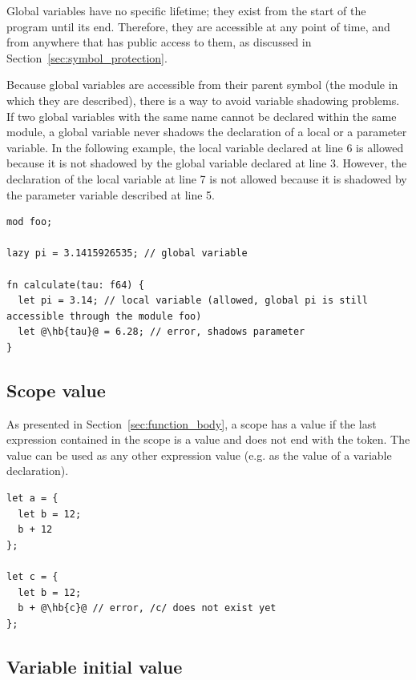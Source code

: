 Global variables have no specific lifetime; they exist from the start of the
program until its end. Therefore, they are accessible at any point of time, and
from anywhere that has public access to them, as discussed in
Section~\ref{sec:symbol_protection}.

Because global variables are accessible from their parent symbol (the module in
which they are described), there is a way to avoid variable shadowing problems.
If two global variables with the same name cannot be declared within the same
module, a global variable never shadows the declaration of a local or a
parameter variable. In the following example, the local variable 
declared at line 6 is allowed because it is not shadowed by the global variable
declared at line 3. However, the declaration of the local variable 
at line 7 is not allowed because it is shadowed by the parameter variable
described at line 5.

\begin{lstlisting}[style=coloredverbatimError, escapechar=@]
mod foo;

lazy pi = 3.1415926535; // global variable

fn calculate(tau: f64) {
  let pi = 3.14; // local variable (allowed, global pi is still accessible through the module foo)
  let @\hb{tau}@ = 6.28; // error, shadows parameter
}

\end{lstlisting}

\subsection{Scope value}

As presented in Section~\ref{sec:function_body}, a scope has a value if the last
expression contained in the scope is a value and does not end with the \token{;}
token. The value can be used as any other expression value (e.g. as the value of
a variable declaration).

\begin{lstlisting}[style=coloredverbatimError, escapechar=@]
let a = {
  let b = 12;
  b + 12
};

let c = {
  let b = 12;
  b + @\hb{c}@ // error, /c/ does not exist yet
};
\end{lstlisting}

\subsection{Variable initial value}
\label{sec:variable_init_value}

